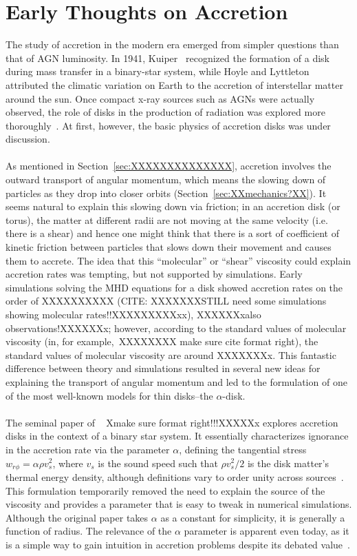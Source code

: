 \section{Early Thoughts on Accretion}\label{sec:early}
The study of accretion in the modern era emerged from simpler questions than that of AGN luminosity. In 1941, Kuiper~\cite{Kuiper1941} recognized the formation of a disk during mass transfer in a binary-star system, while Hoyle and Lyttleton~\cite{HoyleLyttleton1939} attributed the climatic variation on Earth to the accretion of interstellar matter around the sun. Once compact x-ray sources such as AGNs were actually observed, the role of disks in the production of radiation was explored more thoroughly~\cite{PrendergastBurbidge1968}. At first, however, the basic physics of accretion disks was under discussion.\\
\\
As mentioned in Section~\ref{sec:XXXXXXXXXXXXXX}, accretion involves the outward transport of angular momentum, which means the slowing down of particles as they drop into closer orbits (Section~\ref{sec:XXmechanics?XX}). It seems natural to explain this slowing down via friction; in an accretion disk (or torus), the matter at different radii are not moving at the same velocity (i.e. there is a shear) and hence one might think that there is a sort of coefficient of kinetic friction between particles that slows down their movement and causes them to accrete. The idea that this ``molecular'' or ``shear'' viscosity could explain accretion rates was tempting, but not supported by simulations. Early simulations solving the MHD equations for a disk showed accretion rates on the order of XXXXXXXXXX (CITE: XXXXXXXSTILL need some simulations showing molecular rates!!XXXXXXXXXxx), XXXXXXxalso observations!XXXXXXx; however, according to the standard values of molecular viscosity (in, for example,~\cite{Spitzer1962}XXXXXXXX make sure cite format right), the standard values of molecular viscosity are around XXXXXXXx. This fantastic difference between theory and simulations resulted in several new ideas for explaining the transport of angular momentum and led to the formulation of one of the most well-known models for thin disks--the $\alpha$-disk.\\
\\
The seminal paper of ~\cite{SS1973} Xmake sure format right!!!XXXXXx explores accretion disks in the context of a binary star system. It essentially characterizes ignorance in the accretion rate via the parameter $\alpha$, defining the tangential stress $w_{r\phi}=\alpha\rho v_s^2$, where $v_s$ is the sound speed such that $\rho v_s^2/2$ is the disk matter's thermal energy density, although definitions vary to order unity across sources~\cite{SS1973}. This formulation temporarily removed the need to explain the source of the viscosity and provides a parameter that is easy to tweak in numerical simulations. Although the original paper takes $\alpha$ as a constant for simplicity, it is generally a function of radius. The relevance of the $\alpha$ parameter is apparent even today, as it is a simple way to gain intuition in accretion problems despite its debated value~\cite{PennaEA2013}. \\
